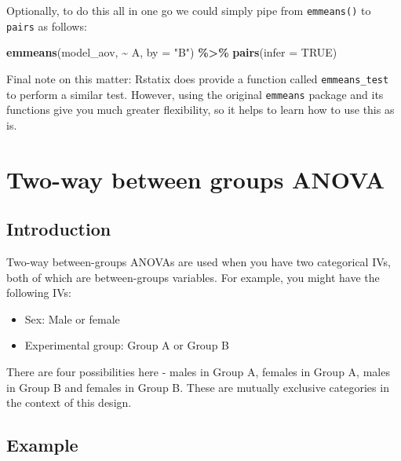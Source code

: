 \documentclass[
]{book}
\newenvironment{Shaded}{\begin{snugshade}}{\end{snugshade}}
\newcommand{\AttributeTok}[1]{\textcolor[rgb]{0.13,0.29,0.53}{#1}}
\newcommand{\ConstantTok}[1]{\textcolor[rgb]{0.56,0.35,0.01}{#1}}
\newcommand{\FunctionTok}[1]{\textcolor[rgb]{0.13,0.29,0.53}{\textbf{#1}}}
\newcommand{\NormalTok}[1]{#1}
\newcommand{\SpecialCharTok}[1]{\textcolor[rgb]{0.81,0.36,0.00}{\textbf{#1}}}
\newcommand{\StringTok}[1]{\textcolor[rgb]{0.31,0.60,0.02}{#1}}
\providecommand{\tightlist}{%
  \setlength{\itemsep}{0pt}\setlength{\parskip}{0pt}}
\begin{document}
Optionally, to do this all in one go we could simply pipe from \texttt{emmeans()} to \texttt{pairs} as follows:

\begin{Shaded}
\begin{Highlighting}[]
\FunctionTok{emmeans}\NormalTok{(model\_aov, }\SpecialCharTok{\textasciitilde{}}\NormalTok{ A, }\AttributeTok{by =} \StringTok{"B"}\NormalTok{) }\SpecialCharTok{\%\textgreater{}\%}
  \FunctionTok{pairs}\NormalTok{(}\AttributeTok{infer =} \ConstantTok{TRUE}\NormalTok{)}
\end{Highlighting}
\end{Shaded}

Final note on this matter: Rstatix does provide a function called \texttt{emmeans\_test} to perform a similar test. However, using the original \texttt{emmeans} package and its functions give you much greater flexibility, so it helps to learn how to use this as is.

\hypertarget{two-way-between-groups-anova}{%
\section{Two-way between groups ANOVA}\label{two-way-between-groups-anova}}

\hypertarget{introduction-1}{%
\subsection{Introduction}\label{introduction-1}}

Two-way between-groups ANOVAs are used when you have two categorical IVs, both of which are between-groups variables. For example, you might have the following IVs:

\begin{itemize}
\tightlist
\item
  Sex: Male or female
\item
  Experimental group: Group A or Group B
\end{itemize}

There are four possibilities here - males in Group A, females in Group A, males in Group B and females in Group B. These are mutually exclusive categories in the context of this design.

\hypertarget{example-2}{%
\subsection{Example}\label{example-2}}
\end{document}
